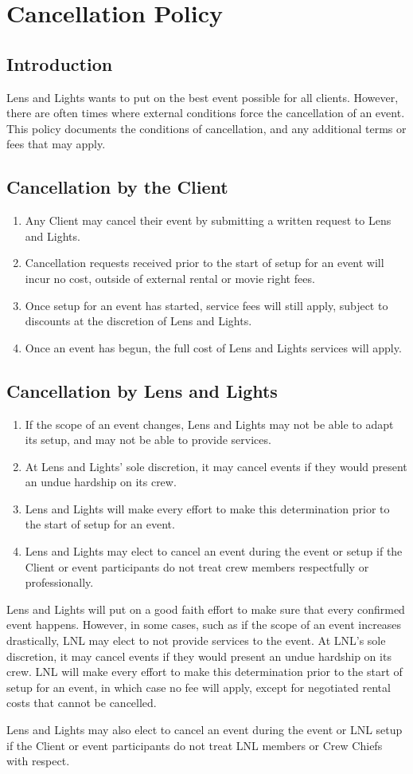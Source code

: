 \chapter{Cancellation Policy}

\section{Introduction} 
Lens and Lights wants to put on the best event possible for all clients. However,
there are often times where external conditions force the cancellation of an
event. This policy documents the conditions of cancellation, and any additional
terms or fees that may apply.

\section{Cancellation by the Client}
\begin{enumerate}
    \item Any Client may cancel their event by submitting a written request to
        Lens and Lights.
    \item Cancellation requests received prior to the start of setup for an
        event will incur no cost, outside of external rental or movie right
        fees.
    \item Once setup for an event has started, service fees will still apply,
        subject to discounts at the discretion of Lens and Lights.
    \item Once an event has begun, the full cost of Lens and Lights services
        will apply.
\end{enumerate}

\section{Cancellation by Lens and Lights}
\begin{enumerate}
    \item If the scope of an event changes, Lens and Lights may not be able to
        adapt its setup, and may not be able to provide services.
    \item At Lens and Lights' sole discretion, it may cancel events if they
        would present an undue hardship on its crew.
    \item Lens and Lights will make every effort to make this determination
        prior to the start of setup for an event.
    \item Lens and Lights may elect to cancel an event during the event or setup
        if the Client or event participants do not treat crew members
        respectfully or professionally.
\end{enumerate}
Lens and Lights will put on a good faith effort to make sure that every
confirmed
event happens. However, in some cases, such as if the scope of an event
increases drastically, LNL may elect to not provide services to the event. At
LNL’s sole discretion, it may cancel events if they would present an undue
hardship on its crew. LNL will make every effort to make this determination
prior to the start of setup for an event, in which case no fee will apply,
except for negotiated rental costs that cannot be cancelled.

Lens and Lights may also elect to cancel an event during the event or LNL setup
if the Client or event participants do not treat LNL members or Crew Chiefs with
respect.
